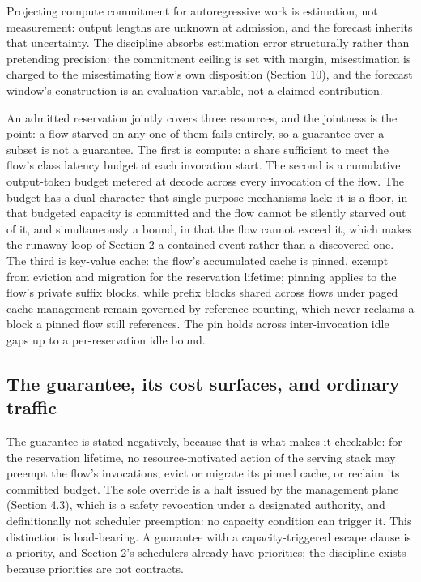 Projecting compute commitment for autoregressive work is estimation, not
measurement: output lengths are unknown at admission, and the forecast
inherits that uncertainty. The discipline absorbs estimation error
structurally rather than pretending precision: the commitment ceiling is
set with margin, misestimation is charged to the misestimating flow's own
disposition (Section 10), and the forecast window's construction is an
evaluation variable, not a claimed contribution.

An admitted reservation jointly covers three resources, and the jointness
is the point: a flow starved on any one of them fails entirely, so a
guarantee over a subset is not a guarantee. The first is compute: a share
sufficient to meet the flow's class latency budget at each invocation
start. The second is a cumulative output-token budget metered at decode
across every invocation of the flow. The budget has a dual character that
single-purpose mechanisms lack: it is a floor, in that budgeted capacity
is committed and the flow cannot be silently starved out of it, and
simultaneously a bound, in that the flow cannot exceed it, which makes
the runaway loop of Section 2 a contained event rather than a discovered
one. The third is key-value cache: the flow's accumulated cache is
pinned, exempt from eviction and migration for the reservation lifetime;
pinning applies to the flow's private suffix blocks, while prefix blocks
shared across flows under paged cache management remain governed by
reference counting, which never reclaims a block a pinned flow still
references. The pin holds across inter-invocation idle gaps up to a
per-reservation idle bound.

\subsection{The guarantee, its cost surfaces, and ordinary traffic}

The guarantee is stated negatively, because that is what makes it
checkable: for the reservation lifetime, no resource-motivated action of
the serving stack may preempt the flow's invocations, evict or migrate
its pinned cache, or reclaim its committed budget. The sole override is a
halt issued by the management plane (Section 4.3), which is a safety
revocation under a designated authority, and definitionally not scheduler
preemption: no capacity condition can trigger it. This distinction is
load-bearing. A guarantee with a capacity-triggered escape clause is a
priority, and Section 2's schedulers already have priorities; the
discipline exists because priorities are not contracts.

